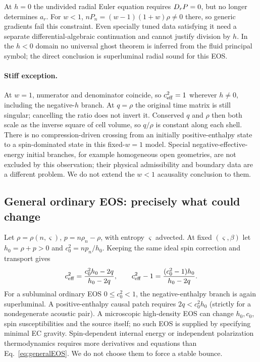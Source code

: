 At $h=0$ the undivided radial Euler equation requires $D_r P=0$, but no longer determines $a_r$. For $w<1$, $nP_n=(w-1)(1+w)\rho\ne0$ there, so generic gradients fail this constraint. Even specially tuned data satisfying it need a separate differential-algebraic continuation and cannot justify division by $h$. In the $h<0$ domain no universal ghost theorem is inferred from the fluid principal symbol; the direct conclusion is superluminal radial sound for this EOS.

\paragraph{Stiff exception.} At $w=1$, numerator and denominator coincide, so $c_{\rm eff}^2=1$ wherever $h\ne0$, including the negative-$h$ branch. At $q=\rho$ the original time matrix is still singular; cancelling the ratio does not invert it. Conserved $q$ and $\rho$ then both scale as the inverse square of cell volume, so $q/\rho$ is constant along each shell. There is no compression-driven crossing from an initially positive-enthalpy state to a spin-dominated state in this fixed-$w=1$ model. Special negative-effective-energy initial branches, for example homogeneous open geometries, are not excluded by this observation; their physical admissibility and boundary data are a different problem. We do not extend the $w<1$ acausality conclusion to them.

\subsection{General ordinary EOS: precisely what could change}
Let $\rho=\rho(n,\varsigma)$, $p=n\rho_n-\rho$, with entropy $\varsigma$ advected. At fixed $(\varsigma,\beta)$ let $h_0=\rho+p>0$ and $c_0^2=n p_n/h_0$. Keeping the same ideal spin correction and transport gives
\begin{equation}\label{eq:generalEOS}
 c_{\rm eff}^2=\frac{c_0^2 h_0-2q}{h_0-2q},\qquad
 c_{\rm eff}^2-1=\frac{(c_0^2-1)h_0}{h_0-2q}.
\end{equation}
For a subluminal ordinary EOS $0\leq c_0^2<1$, the negative-enthalpy branch is again superluminal. A positive-enthalpy causal patch requires $2q<c_0^2h_0$ (strictly for a nondegenerate acoustic pair). A microscopic high-density EOS can change $h_0,c_0$, spin susceptibilities and the source itself; no such EOS is supplied by specifying minimal EC gravity. Spin-dependent internal energy or independent polarization thermodynamics requires more derivatives and equations than Eq.~\eqref{eq:generalEOS}. We do not choose them to force a stable bounce.


